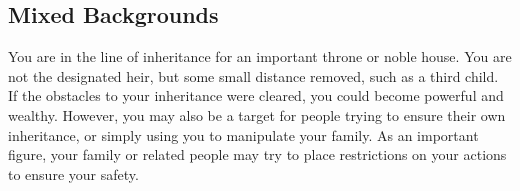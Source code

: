     \subsection{Mixed Backgrounds}
         You are in the line of inheritance for an important throne or noble house.
        You are not the designated heir, but some small distance removed, such as a third child.
        If the obstacles to your inheritance were cleared, you could become powerful and wealthy.
        However, you may also be a target for people trying to ensure their own inheritance, or simply using you to manipulate your family.
        As an important figure, your family or related people may try to place restrictions on your actions to ensure your safety.
        




